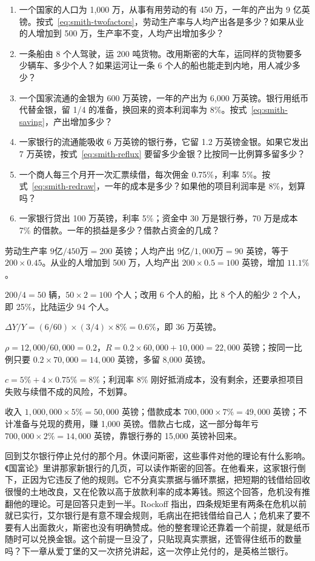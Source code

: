 \begin{selfcheck}
\begin{enumerate}
\item 一个国家的人口为 1,000 万，从事有用劳动的有 450 万，一年的产出为 9 亿英镑。按式~\eqref{eq:smith-twofactors}，劳动生产率与人均产出各是多少？如果从业的人增加到 500 万，生产率不变，人均产出增加多少？
\item 一条船由 8 个人驾驶，运 200 吨货物。改用斯密的大车，运同样的货物要多少辆车、多少个人？如果运河让一条 6 个人的船也能走到内地，用人减少多少？
\item 一个国家流通的金银为 600 万英镑，一年的产出为 6,000 万英镑。银行用纸币代替金银，留 1/4 的准备，换回来的资本利润率为 8\%。按式~\eqref{eq:smith-saving}，产出增加多少？
\item 一家银行的流通能吸收 6 万英镑的银行券，它留 1.2 万英镑金银。如果它发出 7 万英镑，按式~\eqref{eq:smith-reflux} 要留多少金银？比按同一比例算多留多少？
\item 一个商人每三个月开一次汇票续借，每次佣金 0.75\%，利率 5\%。按式~\eqref{eq:smith-redraw}，一年的成本是多少？如果他的项目利润率是 8\%，划算吗？
\item 一家银行贷出 100 万英镑，利率 5\%；资金中 30 万是银行券，70 万是成本 7\% 的借款。一年的损益是多少？借款占资金的几成？
\end{enumerate}
\end{selfcheck}

\begin{answers}
\item 劳动生产率 $9\text{亿}/450\text{万}=200$ 英镑；人均产出 $9\text{亿}/1{,}000\text{万}=90$ 英镑，等于 $200\times0.45$。从业的人增加到 500 万，人均产出 $200\times0.5=100$ 英镑，增加 $11.1\%$。
\item $200/4=50$ 辆，$50\times2=100$ 个人；改用 6 个人的船，比 8 个人的船少 2 个人，即 25\%，比陆运少 94 个人。
\item $\Delta Y/Y=(6/60)\times(3/4)\times8\%=0.6\%$，即 36 万英镑。
\item $\rho=12{,}000/60{,}000=0.2$，$R=0.2\times60{,}000+10{,}000=22{,}000$ 英镑；按同一比例只要 $0.2\times70{,}000=14{,}000$ 英镑，多留 8,000 英镑。
\item $c=5\%+4\times0.75\%=8\%$；利润率 8\% 刚好抵消成本，没有剩余，还要承担项目失败与续借不成的风险，不划算。
\item 收入 $1{,}000{,}000\times5\%=50{,}000$ 英镑；借款成本 $700{,}000\times7\%=49{,}000$ 英镑；不计准备与兑现的费用，赚 1,000 英镑。借款占七成，这一部分每年亏 $700{,}000\times2\%=14{,}000$ 英镑，靠银行券的 15,000 英镑补回来。
\end{answers}

回到艾尔银行停止兑付的那个月。休谟问斯密，这些事件对他的理论有什么影响。《国富论》里讲那家新银行的几页，可以读作斯密的回答。在他看来，这家银行倒下，正因为它违反了他的规则。它不分真实票据与循环票据，把短期的钱借给回收很慢的土地改良，又在伦敦以高于放款利率的成本筹钱。照这个回答，危机没有推翻他的理论。可是回答只走到一半。Rockoff 指出，四条规矩里有两条在危机以前就已实行，艾尔银行是有意不理会规则，毛病出在把钱借给自己人；危机来了要不要有人出面救火，斯密也没有明确赞成。他的整套理论还靠着一个前提，就是纸币随时可以兑换金银。这个前提一旦没了，只贴现真实票据，还管得住纸币的数量吗？下一章从爱丁堡的又一次挤兑讲起，这一次停止兑付的，是英格兰银行。
